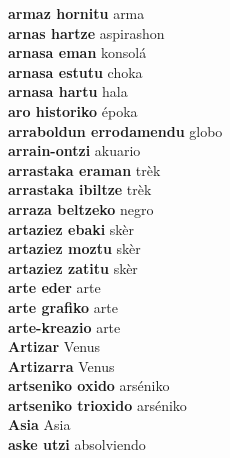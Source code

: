 \textbf{ armaz hornitu  } arma \\
\textbf{ arnas hartze  } aspirashon \\
\textbf{ arnasa eman  } konsolá \\
\textbf{ arnasa estutu  } choka \\
\textbf{ arnasa hartu  } hala \\
\textbf{ aro historiko  } époka \\
\textbf{ arraboldun errodamendu  } globo \\
\textbf{ arrain-ontzi  } akuario \\
\textbf{ arrastaka eraman  } trèk \\
\textbf{ arrastaka ibiltze  } trèk \\
\textbf{ arraza beltzeko  } negro \\
\textbf{ artaziez ebaki  } skèr \\
\textbf{ artaziez moztu  } skèr \\
\textbf{ artaziez zatitu  } skèr \\
\textbf{ arte eder  } arte \\
\textbf{ arte grafiko  } arte \\
\textbf{ arte-kreazio  } arte \\
\textbf{ Artizar  } Venus \\
\textbf{ Artizarra  } Venus \\
\textbf{ artseniko oxido  } arséniko \\
\textbf{ artseniko trioxido  } arséniko \\
\textbf{ Asia  } Asia \\
\textbf{ aske utzi  } absolviendo \\

